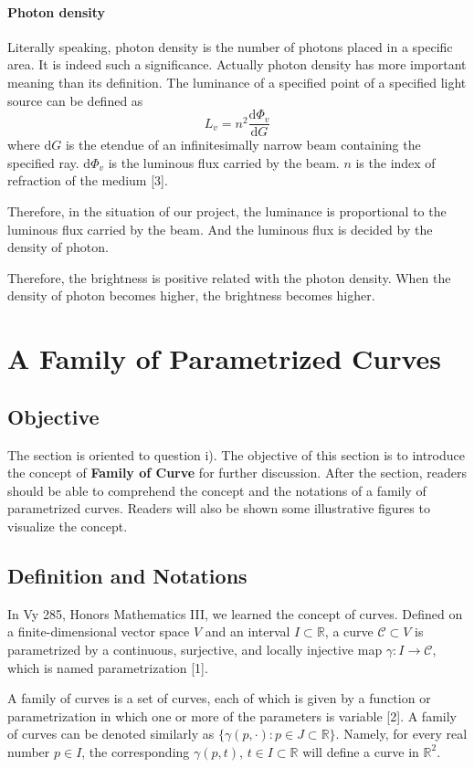 \documentclass[a4paper]{article}
\begin{document}
\paragraph{Photon density}

Literally speaking, photon density is the number of photons placed in a specific area. It is indeed such a significance. Actually photon density has more important meaning than its definition. The luminance of a specified point of a specified light source can be defined as
    \begin{equation*}
        L_v=n^2\frac{\text{d}\Phi _v}{\text{d}G}
    \end{equation*}
    where $\text{d}G$ is the etendue of an infinitesimally narrow beam containing the specified ray. $\text{d}\Phi _v$ is the luminous flux carried by the beam. $n$ is the index of refraction of the medium [3].
    
Therefore, in the situation of our project, the luminance is proportional to the luminous flux carried by the beam. And the luminous flux is decided by the density of photon.
    
Therefore, the brightness is positive related with the photon density. When the density of photon becomes higher, the brightness becomes higher.
\section{A Family of Parametrized Curves}
\subsection{Objective}
The section is oriented to question i). The objective of this section is to introduce the concept of \textbf{Family of Curve} for further discussion. After the section, readers should be able to comprehend the concept and the notations of a family of parametrized curves. Readers will also be shown some illustrative figures to visualize the concept.
\subsection{Definition and Notations}
In Vy 285, Honors Mathematics III, we learned the concept of curves. Defined on a finite-dimensional vector space $V$ and an interval $I \subset \mathbb{R}$, a curve $\mathcal{C} \subset V$ is parametrized by a continuous, surjective, and locally injective map $\gamma: I \to \mathcal{C}$, which is named parametrization [1].

A family of curves is a set of curves, each of which is given by a function or parametrization in which one or more of the parameters is variable [2]. A family of curves can be denoted similarly as $\{\gamma(p,\cdot):p \in J \subset \mathbb{R}\}$. Namely, for every real number $p \in I$, the corresponding $\gamma(p,t)$, $t \in I \subset \mathbb{R}$ will define a curve in $\mathbb{R}^2$.
\end{document}
